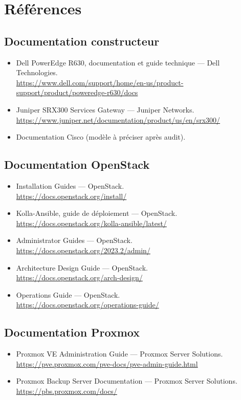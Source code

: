\chapter{Références}
\begingroup\small{}\setlength{\parskip}{0pt}

\newcommand{\refdoc}[3]{\item #1 — #2.\\{\sffamily\footnotesize\color{muted}\url{#3}}}

\vspace{-4pt}\section*{Documentation constructeur}
\begin{itemize}
  \refdoc{Dell PowerEdge R630, documentation et guide technique}{Dell Technologies}{https://www.dell.com/support/home/en-us/product-support/product/poweredge-r630/docs}
  \refdoc{Juniper SRX300 Services Gateway}{Juniper Networks}{https://www.juniper.net/documentation/product/us/en/srx300/}
  \item Documentation Cisco (modèle à préciser après audit).
\end{itemize}

\vspace{-4pt}\section*{Documentation OpenStack}
\begin{itemize}
  \refdoc{Installation Guides}{OpenStack}{https://docs.openstack.org/install/}
  \refdoc{Kolla-Ansible, guide de déploiement}{OpenStack}{https://docs.openstack.org/kolla-ansible/latest/}
  \refdoc{Administrator Guides}{OpenStack}{https://docs.openstack.org/2023.2/admin/}
  \refdoc{Architecture Design Guide}{OpenStack}{https://docs.openstack.org/arch-design/}
  \refdoc{Operations Guide}{OpenStack}{https://docs.openstack.org/operations-guide/}
\end{itemize}

\vspace{-4pt}\section*{Documentation Proxmox}
\begin{itemize}
  \refdoc{Proxmox VE Administration Guide}{Proxmox Server Solutions}{https://pve.proxmox.com/pve-docs/pve-admin-guide.html}
  \refdoc{Proxmox Backup Server Documentation}{Proxmox Server Solutions}{https://pbs.proxmox.com/docs/}
\end{itemize}

